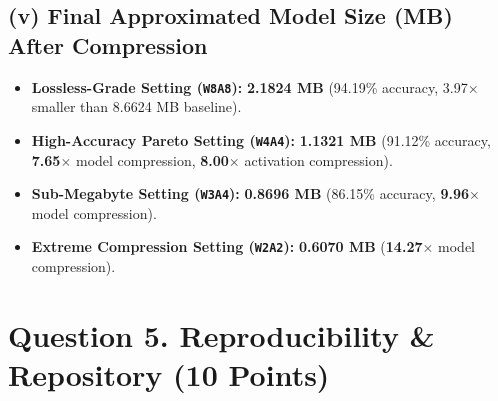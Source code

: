 \documentclass[11pt,a4paper]{article}
\begin{document}
\subsection*{(v) Final Approximated Model Size (MB) After Compression}
\begin{itemize}\setlength\itemsep{1pt}
    \item \textbf{Lossless-Grade Setting (\texttt{W8A8}):} \textbf{2.1824 MB} (94.19\% accuracy, 3.97$\times$ smaller than 8.6624 MB baseline).
    \item \textbf{High-Accuracy Pareto Setting (\texttt{W4A4}):} \textbf{1.1321 MB} (91.12\% accuracy, \textbf{7.65$\times$} model compression, \textbf{8.00$\times$} activation compression).
    \item \textbf{Sub-Megabyte Setting (\texttt{W3A4}):} \textbf{0.8696 MB} (86.15\% accuracy, \textbf{9.96$\times$} model compression).
    \item \textbf{Extreme Compression Setting (\texttt{W2A2}):} \textbf{0.6070 MB} (\textbf{14.27$\times$} model compression).
\end{itemize}

\section*{Question 5. Reproducibility \& Repository (10 Points)}
\end{document}

